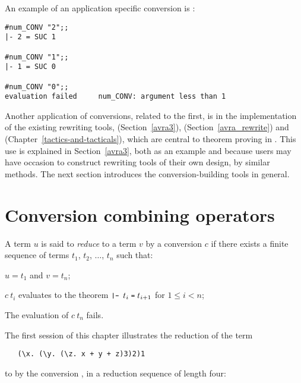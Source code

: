 \noindent An example of an application specific conversion is
:

\setcounter{sessioncount}{1}
\begin{session}\begin{verbatim}
#num_CONV "2";;
|- 2 = SUC 1

#num_CONV "1";;
|- 1 = SUC 0

#num_CONV "0";;
evaluation failed     num_CONV: argument less than 1
\end{verbatim}\end{session}

Another application of conversions, related to the first, is in the 
implementation of the existing rewriting tools, 
 (Section~\ref{avra3}),
 (Section~\ref{avra_rewrite}) and
 (Chapter~\ref{tactics-and-tacticals}), 
which are central to theorem proving in \HOL.
This use is explained in Section~\ref{avra3},
both as an example and because users may have occasion to construct
rewriting tools of their own design, by similar methods.
The next section introduces the conversion-building tools in general.

\section{Conversion combining operators}
\label{avra1}

A term $u$ is said to {\it reduce\/} to a term $v$ by a conversion $c$ if
there exists a 
finite sequence of terms $t_1$, $t_2$, $\ldots$, $t_n$ such that:
\begin{myenumerate}
\item $u = t_1$ and $v = t_n$;
\item $c\ t_i$ evaluates to the theorem 
$\ml{|- }t_i\;\ml{=}\;t_{i+1}$ for $1\leq i < n$;
\item The evaluation of $c\ t_n$ fails.
\end{myenumerate}

\noindent The first session of this chapter illustrates the reduction of 
the term

\begin{hol}\begin{verbatim}
   (\x. (\y. (\z. x + y + z)3)2)1
\end{verbatim}\end{hol}

\noindent to  by the
conversion , in a reduction sequence of length four:


